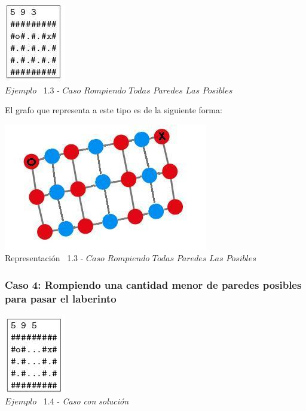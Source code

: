 \vspace*{0.3cm} \vspace*{0.3cm}
  \begin{center}
 \includegraphics[scale=1.6]{./EJ1/ej1rompertodasparedes.jpeg}
\\ {$Ejemplo$ \ 1.3 - $Caso$ $Rompiendo$ $Todas$ $Paredes$ $Las$ $Posibles$}
  \end{center}
  \vspace*{0.3cm}

El grafo que representa a este tipo es de la siguiente forma:\\

\vspace*{0.3cm} \vspace*{0.3cm}
  \begin{center}
 \includegraphics[scale=0.5]{./EJ1/ej1grafosolucionconpared.jpeg}
 \\{Representaci\'on \ 1.3 - $Caso$ $Rompiendo$ $Todas$ $Paredes$ $Las$ $Posibles$}
  \end{center}
  \vspace*{0.3cm}

\begin{center}
  \subsubsection*{Caso 4: Rompiendo una cantidad menor de paredes posibles para pasar el laberinto}
\end{center}

\vspace*{0.3cm} \vspace*{0.3cm}
  \begin{center}
 \includegraphics[scale=1.6]{./EJ1/ej1random.jpeg}
\\ {$Ejemplo$ \ 1.4 - \textit{Caso con solución}}
  \end{center}
  \vspace*{0.3cm}

